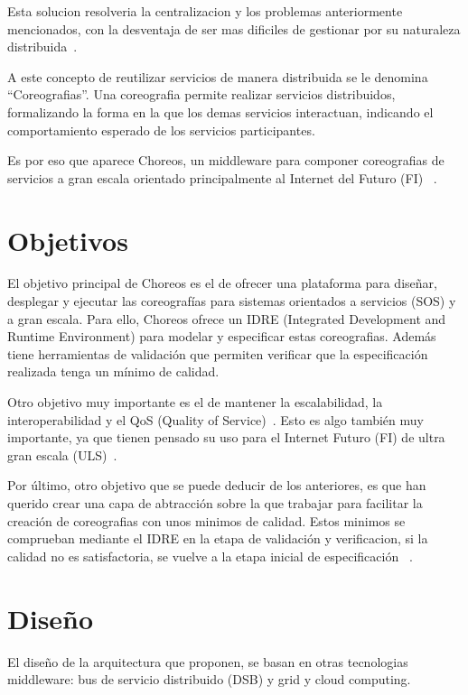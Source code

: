 \documentclass[runningheads]{llncs}
\begin{document}
Esta solucion resolveria la centralizacion y los problemas anteriormente mencionados, con la desventaja de ser mas dificiles de gestionar por su naturaleza distribuida~\cite{a_1}.

A este concepto de reutilizar servicios de manera distribuida se le denomina ``Coreografias''. Una coreografia permite realizar servicios distribuidos, formalizando la forma en la que los demas servicios interactuan, indicando el comportamiento esperado de los servicios participantes.

Es por eso que aparece Choreos, un middleware para componer coreografias de servicios a gran escala orientado principalmente al Internet del Futuro (FI) ~\cite{a_1}.

\section{Objetivos}
El objetivo principal de Choreos es el de ofrecer una plataforma para diseñar, desplegar y ejecutar las coreografías para sistemas orientados a servicios (SOS) y a gran escala. Para ello, Choreos ofrece un IDRE (Integrated Development and Runtime Environment) para modelar y especificar estas coreografias. Además tiene herramientas de validación que permiten verificar que la especificación realizada tenga un mínimo de calidad. ~\cite{a_2}

Otro objetivo muy importante es el de mantener la escalabilidad, la interoperabilidad y el QoS (Quality of Service)~\cite{a_3}. Esto es algo también muy importante, ya que tienen pensado su uso para el Internet Futuro (FI) de ultra gran escala (ULS)~\cite{a_2}.

Por último, otro objetivo que se puede deducir de los anteriores, es que han querido crear una capa de abtracción sobre la que trabajar para facilitar la creación de coreografias con unos minimos de calidad. Estos minimos se comprueban mediante el IDRE en la etapa de validación y verificacion, si la calidad no es satisfactoria, se vuelve a la etapa inicial de especificación ~\cite{a_2}.

\section{Diseño}
El diseño de la arquitectura que proponen, se basan en otras tecnologias middleware: bus de servicio distribuido (DSB) y grid y cloud computing.~\cite{a_1}
\end{document}
